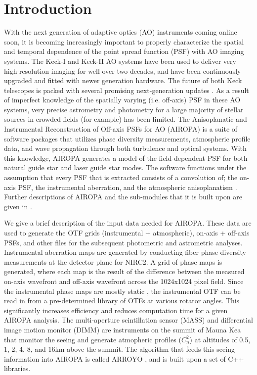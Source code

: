 \documentclass[]{spie}  %
\begin{document}
\section{Introduction} \label{sec:intro}
With the next generation of adaptive optics (AO) instruments coming online soon, it is becoming increasingly important to properly characterize the spatial and temporal dependence of the point spread function (PSF) with AO imaging systems. The Keck-I and Keck-II AO systems have been used to deliver very high-resolution imaging for well over two decades, and have been continuously upgraded and fitted with newer generation hardware. The future of both Keck telescopes is packed with several promising next-generation updates \citep{wizinowich:2020a, bond:2020a}. 
As a result of imperfect knowledge of the spatially varying (i.e. off-axis) PSF in these AO systems, very precise astrometry and photometry for a large majority of stellar sources in crowded fields (for example) has been limited. The Anisoplanatic and Instrumental Reconstruction of Off-axis PSFs for AO (AIROPA) is a suite of software packages that utilizes phase diversity measurements, atmospheric profile data, and wave propagation through both turbulence and optical systems. With this knowledge, AIROPA generates a model of the field-dependent PSF for both natural guide star and laser guide star modes. The software functions under the assumption that every PSF that is extracted consists of a convolution of; the on-axis PSF, the instrumental aberration, and the atmospheric anisoplanatism \cite{do:2018a}. Further descriptions of AIROPA and the sub-modules that it is built upon are given in \cite{witzel:2016a}.

\indent We give a brief description of the input data needed for AIROPA. These data are used to generate the OTF grids (instrumental + atmospheric), on-axis + off-axis PSFs, and other files for the subsequent photometric and astrometric analyses. Instrumental aberration maps are generated by conducting fiber phase diversity measurements at the detector plane for NIRC2. A grid of phase maps is generated, where each map is the result of the difference between the measured on-axis wavefront and off-axis wavefront across the 1024x1024 pixel field. Since the instrumental phase maps are mostly static \citep{Ciurlo:inprep}, the instrumental OTF can be read in from a pre-determined library of OTFs at various rotator angles. This significantly increases efficiency and reduces computation time for a given AIROPA analysis. The multi-aperture scintillation sensor (MASS) and differential image motion monitor (DIMM) are instruments on the summit of Mauna Kea that monitor the seeing and generate atmopheric profiles ($C_n^{2}$) at altitudes of 0.5, 1, 2, 4, 8, and 16km above the summit. The algorithm that feeds this seeing information into AIROPA is called ARROYO \citep{britton:2006a}, and is built upon a set of C++ libraries. 
\end{document}
